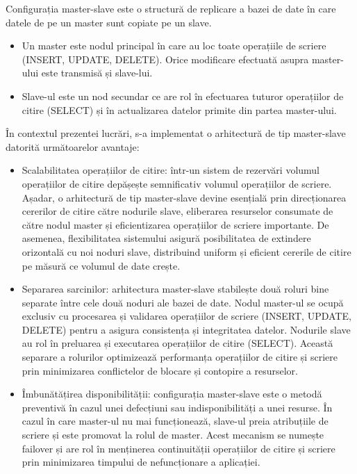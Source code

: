 \documentclass[12pt, a4paper, oneside, romanian]{teza-upb}
\begin{document}
	Configurația master-slave este o structură de replicare a bazei de date în care datele de pe un master sunt copiate pe un slave. 
	\begin{itemize}
		\item Un master este nodul principal în care au loc toate operațiile de scriere (INSERT, UPDATE, DELETE). Orice modificare efectuată asupra master-ului este transmisă și slave-lui. 
		\item Slave-ul este un nod secundar ce are rol în efectuarea tuturor operațiilor de citire (SELECT) și în actualizarea datelor primite din partea master-ului. 
		
		
	\end{itemize}
		
	
	În contextul prezentei lucrări, s-a implementat o arhitectură de tip master-slave datorită următoarelor avantaje:
	\begin {itemize}
	\item Scalabilitatea operațiilor de citire: într-un sistem de rezervări volumul operațiilor de citire depășește semnificativ volumul operațiilor de scriere. Așadar, o arhitectură de tip master-slave devine esențială prin direcționarea cererilor de citire către nodurile slave, eliberarea resurselor consumate de către nodul master și eficientizarea operațiilor de scriere importante. De asemenea, flexibilitatea sistemului asigură posibilitatea de extindere orizontală cu noi noduri slave, distribuind uniform și eficient cererile de citire pe măsură ce volumul de date crește.
	\item Separarea sarcinilor: arhitectura master-slave stabilește două roluri bine separate între cele două noduri ale bazei de date.  Nodul master-ul se ocupă exclusiv cu procesarea și validarea operațiilor de scriere (INSERT, UPDATE, DELETE) pentru a asigura consistența și integritatea datelor. Nodurile slave au rol în preluarea și executarea operațiilor de citire (SELECT). Această separare a rolurilor optimizează performanța operațiilor de citire și scriere prin minimizarea conflictelor de blocare și contopire a resurselor.
	\item Îmbunătățirea disponibilității: configurația master-slave este o metodă preventivă în cazul unei defecțiuni sau indisponibilități a unei resurse. În cazul în care master-ul nu mai funcționează, slave-ul preia atribuțiile de scriere și este promovat la rolul de master. Acest mecanism se numește failover și are rol în menținerea continuității operațiilor de citire și scriere prin minimizarea timpului de nefuncționare a aplicației. 
\end{itemize}
\end{document}
